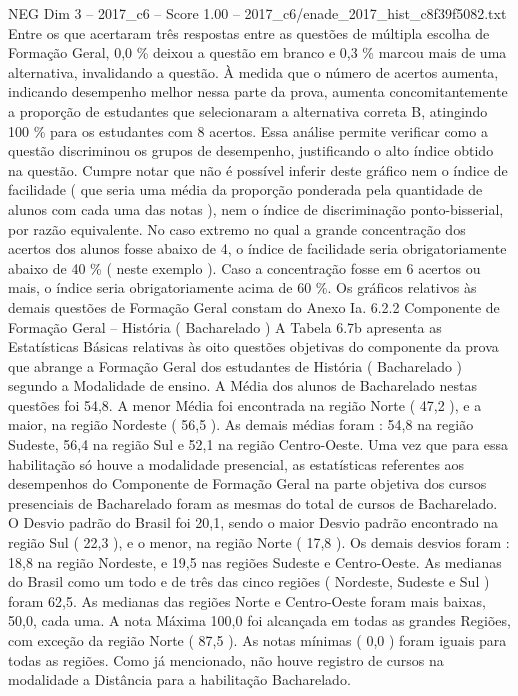 \begin{textsample}{NEG Dim 3 – 2017\_c6 – Score 1.00 – 2017\_c6/enade\_2017\_hist\_c8f39f5082.txt}
Entre os que acertaram três respostas entre as questões de múltipla escolha de Formação Geral, 0,0 \% deixou a questão em branco e 0,3 \% marcou mais de uma alternativa, invalidando a questão.
À medida que o número de acertos aumenta, indicando desempenho melhor nessa parte da prova, aumenta concomitantemente a proporção de estudantes que selecionaram a alternativa correta B, atingindo 100 \% para os estudantes com 8 acertos.
Essa análise permite verificar como a questão discriminou os grupos de desempenho, justificando o alto índice obtido na questão.
Cumpre notar que não é possível inferir deste gráfico nem o índice de facilidade ( que seria uma média da proporção ponderada pela quantidade de alunos com cada uma das notas ), nem o índice de discriminação ponto-bisserial, por razão equivalente.
No caso extremo no qual a grande concentração dos acertos dos alunos fosse abaixo de 4, o índice de facilidade seria obrigatoriamente abaixo de 40 \% ( neste exemplo ).
Caso a concentração fosse em 6 acertos ou mais, o índice seria obrigatoriamente acima de 60 \%.
Os gráficos relativos às demais questões de Formação Geral constam do Anexo Ia. 6.2.2 Componente de Formação Geral – História ( Bacharelado ) A Tabela 6.7b apresenta as Estatísticas Básicas relativas às oito questões objetivas do componente da prova que abrange a Formação Geral dos estudantes de História ( Bacharelado ) segundo a Modalidade de ensino.
A Média dos alunos de Bacharelado nestas questões foi 54,8.
A menor Média foi encontrada na região Norte ( 47,2 ), e a maior, na região Nordeste ( 56,5 ).
As demais médias foram : 54,8 na região Sudeste, 56,4 na região Sul e 52,1 na região Centro-Oeste.
Uma vez que para essa habilitação só houve a modalidade presencial, as estatísticas referentes aos desempenhos do Componente de Formação Geral na parte objetiva dos cursos presenciais de Bacharelado foram as mesmas do total de cursos de Bacharelado.
O Desvio padrão do Brasil foi 20,1, sendo o maior Desvio padrão encontrado na região Sul ( 22,3 ), e o menor, na região Norte ( 17,8 ).
Os demais desvios foram : 18,8 na região Nordeste, e 19,5 nas regiões Sudeste e Centro-Oeste.
As medianas do Brasil como um todo e de três das cinco regiões ( Nordeste, Sudeste e Sul ) foram 62,5.
As medianas das regiões Norte e Centro-Oeste foram mais baixas, 50,0, cada uma.
A nota Máxima 100,0 foi alcançada em todas as grandes Regiões, com exceção da região Norte ( 87,5 ).
As notas mínimas ( 0,0 ) foram iguais para todas as regiões.
Como já mencionado, não houve registro de cursos na modalidade a Distância para a habilitação Bacharelado.

\end{textsample}
